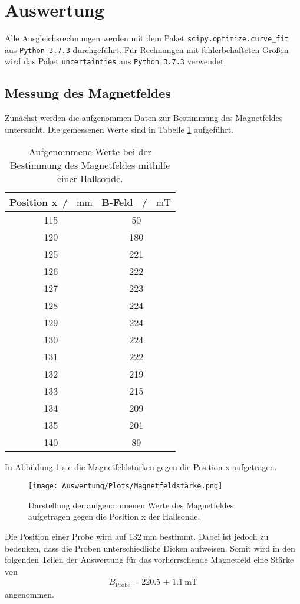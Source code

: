 \section{Auswertung}
Alle Ausgleichsrechnungen werden mit dem Paket \texttt{scipy.optimize.curve\_fit}  aus \texttt{Python 3.7.3} durchgeführt.
Für Rechnungen mit fehlerbehafteten Größen wird das Paket \texttt{uncertainties} aus \texttt{Python 3.7.3} verwendet.

\subsection{Messung des Magnetfeldes}
Zunächst werden die aufgenommen Daten zur Bestimmung des Magnetfeldes untersucht. Die gemessenen Werte
sind in Tabelle \ref{tab:MF_Messung} aufgeführt.
\begin{table}[H]
    \centering
    \caption{Aufgenommene Werte bei der Bestimmung des Magnetfeldes mithilfe einer Hallsonde.}
    \label{tab:MF_Messung}
    \begin{tabular}{cc}
      \toprule
      Position x\, / \, $\si{\milli\meter}$ & B-Feld \, / \, $\si{\milli\tesla}$  \\
      \midrule
      115 & 50  \\
      120 & 180 \\
      125 & 221 \\
      126 & 222 \\
      127 & 223 \\
      128 & 224 \\
      129 & 224 \\
      130 & 224 \\
      131 & 222 \\
      132 & 219 \\
      133 & 215 \\
      134 & 209 \\
      135 & 201 \\
      140 & 89  \\
      \bottomrule
  \end{tabular}
 \end{table} \noindent
 In Abbildung \ref{fig:MF_Messung} sie die Magnetfeldstärken gegen die Position x aufgetragen.
 \begin{figure}[H]
     \centering
     \texttt{[image: Auswertung/Plots/Magnetfeldstärke.png]}
     \caption{Darstellung der aufgenommenen Werte des Magnetfeldes aufgetragen gegen die Position x der Hallsonde.}
     \label{fig:MF_Messung}
 \end{figure} \noindent
 Die Position einer Probe wird auf $\SI{132}{\milli\meter}$ bestimmt. Dabei ist jedoch zu bedenken,
 dass die Proben unterschiedliche Dicken aufweisen.
 Somit wird in den folgenden Teilen der Auswertung für das vorherrschende Magnetfeld eine Stärke von
 \begin{align*}
     B_\text{Probe} = \SI{220.5(11)}{\milli\tesla}
 \end{align*} \noindent
 angenommen.

